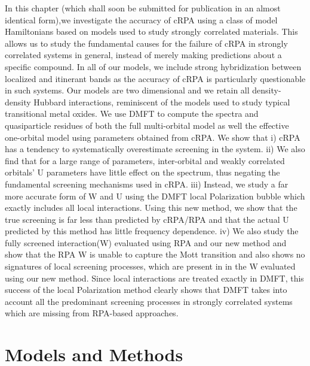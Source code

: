 \documentclass[10pt]{ruthesis}
\begin{document}
{In this chapter (which shall soon be submitted for publication in an almost identical form),we investigate the accuracy of cRPA using a class of model Hamiltonians based on models used to study strongly correlated materials. This allows us to  study the fundamental causes for the failure of cRPA in strongly correlated systems in general, instead of merely making predictions about a specific compound. %
In all of our models, we include strong hybridization between localized and itinerant bands as the accuracy of cRPA is particularly questionable in such systems. Our models are two dimensional and we retain all density-density Hubbard interactions, reminiscent of the models used to study typical transitional metal oxides. 
We use DMFT to compute the spectra and quasiparticle residues of both the full multi-orbital model as well the effective one-orbital model using parameters obtained from cRPA. We show that \textrm{i)} cRPA has a tendency to systematically overestimate screening in the system. \textrm{ii)} We also find that for a large range of parameters, inter-orbital and weakly correlated orbitals' U parameters have little effect on the spectrum, thus negating the fundamental screening mechanisms used in cRPA. \textrm{iii}) Instead, we study a far more accurate form of W and U using the DMFT local Polarization bubble which exactly includes all local interactions. Using this new method, we show that the true screening is far less than predicted by cRPA/RPA and that the actual U predicted by this method has little frequency dependence. \textrm{iv)} We also study the fully screened interaction(W) evaluated using RPA and our new method and show that the RPA W is unable to capture the Mott transition and also shows no signatures of local screening processes, which are present in in the W evaluated using our new method. Since local interactions are treated exactly in DMFT, this success of the local Polarization method clearly shows that DMFT takes into account all the predominant screening processes in strongly correlated systems which are missing from RPA-based approaches. 


\section{Models and Methods}
}
\end{document}
